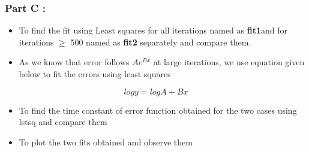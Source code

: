\documentclass[a4paper,10pt]{article}
\providecommand{\tightlist}{%
      \setlength{\itemsep}{0pt}\setlength{\parskip}{0pt}}
\begin{document}
    \subsubsection{Part C :}\label{part-c}

\begin{itemize}
\tightlist
\item
  To find the fit using Least squares for all iterations named as
  \textbf{fit1}and for iterations \(\geq\) 500 named as \textbf{fit2}
  separately and compare them.
\item
  As we know that error follows \(Ae^{Bx}\) at large iterations, we use
  equation given below to fit the errors using least squares
\end{itemize}

\begin{equation}
    logy = logA + Bx
\end{equation}

\begin{itemize}
\tightlist
\item
  To find the time constant of error function obtained for the two cases
  using lstsq and compare them
\item
  To plot the two fits obtained and observe them
\end{itemize}
\end{document}
